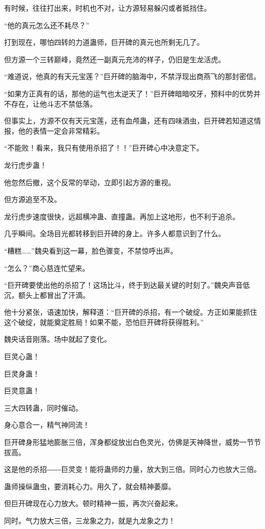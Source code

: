 \begin{this_body}
有时候，往往打出来，时机也不对，让方源轻易躲闪或者抵挡住。

“他的真元怎么还不耗尽？”

打到现在，哪怕四转的力道蛊师，巨开碑的真元也所剩无几了。

但方源一个三转巅峰，竟然还一副真元充沛的样子，仍旧是生龙活虎。

“难道说，他真的有天元宝莲？”巨开碑的脑海中，不禁浮现出商燕飞的那封密信。

“如果方正真有的话，那他的运气也太逆天了！”巨开碑暗暗咬牙，预料中的优势并不存在，让他斗志不禁低落。

但事实上，方源不仅有天元宝莲，还有血颅蛊，还有四味酒虫，巨开碑若知道这情报，他的表情一定会非常精彩。

“不能败！看来，我只有使用杀招了！！”巨开碑心中决意定下。

龙行虎步蛊！

他忽然后撤，这个反常的举动，立即引起方源的重视。

但方源追至不及。

龙行虎步速度很快，远超横冲蛊、直撞蛊。再加上这地形，也不利于追杀。

几乎瞬间。全场目光都转移到巨开碑的身上。许多人都意识到了什么。

“糟糕……”魏央看到这一幕，脸色骤变，不禁惊呼出声。

“怎么？”商心慈连忙望来。

“巨开碑要使出他的杀招了！这场比斗，终于到达最关键的时刻了。”魏央声音低沉，额头上都冒出了汗滴。

他十分紧张，语速加快，解释道：“巨开碑的杀招，有一个破绽。方正如果能抓住这个破绽，就能奠定胜局！如果不能，恐怕巨开碑将获得胜利。”

魏央话音刚落。场中就起了变化。

巨灵心蛊！

巨灵身蛊！

巨灵意蛊！

三大四转蛊，同时催动。

身心意合一，精气神同流！

巨开碑身形猛地膨胀三倍，浑身都绽放出白色灵光，仿佛是天神降世，威势一节节拔高。

这是他的杀招――巨灵变！能将蛊师的力量，放大到三倍。同时心力也放大三倍。

蛊师操纵蛊虫，要消耗心力。用久了，就会精神萎靡。

但巨开碑现在心力放大。顿时精神一振，再次兴奋起来。

同时。气力放大三倍，三龙象之力，就是九龙象之力！


\end{this_body}
